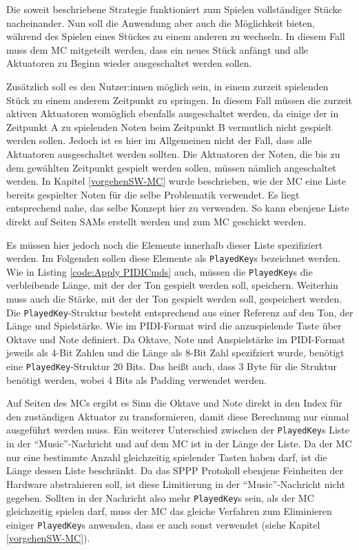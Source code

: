 Die soweit beschriebene Strategie funktioniert zum Spielen vollständiger Stücke nacheinander.
Nun soll die Anwendung aber auch die Möglichkeit bieten, während des Spielen eines Stückes zu einem anderen zu wechseln.
In diesem Fall muss dem \ac{MC} mitgeteilt werden, dass ein neues Stück anfängt und alle Aktuatoren zu Beginn wieder ausgeschaltet werden sollen.

Zusätzlich soll es den Nutzer:innen möglich sein, in einem zurzeit spielenden Stück zu einem anderem Zeitpunkt zu springen.
In diesem Fall müssen die zurzeit aktiven Aktuatoren womöglich ebenfalls ausgeschaltet werden, da einige der in Zeitpunkt A zu spielenden Noten beim Zeitpunkt B vermutlich nicht gespielt werden sollen. \newline
Jedoch ist es hier im Allgemeinen nicht der Fall, dass alle Aktuatoren ausgeschaltet werden sollten.
Die Aktuatoren der Noten, die bis zu dem gewählten Zeitpunkt gespielt werden sollen, müssen nämlich angeschaltet werden. \newline
In Kapitel \ref{vorgehenSW-MC} wurde beschrieben, wie der \ac{MC} eine Liste bereits gespielter Noten für die selbe Problematik verwendet.
Es liegt entsprechend nahe, das selbe Konzept hier zu verwenden.
So kann ebenjene Liste direkt auf Seiten \ac{SAM}s erstellt werden und zum \ac{MC} geschickt werden.

Es müssen hier jedoch noch die Elemente innerhalb dieser Liste spezifiziert werden.
Im Folgenden sollen diese Elemente als \lstinline|PlayedKey|s bezeichnet werden.
Wie in Listing \ref{code:Apply PIDICmds} auch, müssen die \lstinline|PlayedKey|s die verbleibende Länge, mit der der Ton gespielt werden soll, speichern.
Weiterhin muss auch die Stärke, mit der der Ton gespielt werden soll, gespeichert werden.
Die \lstinline|PlayedKey|-Struktur besteht entsprechend aus einer Referenz auf den Ton, der Länge und Spielstärke.
Wie im \ac{PIDI}-Format wird die anzuspielende Taste über Oktave und Note definiert.
Da Oktave, Note und Anspielstärke im \ac{PIDI}-Format jeweils als 4-Bit Zahlen und die Länge als 8-Bit Zahl spezifziert wurde, benötigt eine \lstinline|PlayedKey|-Struktur 20 Bits.
Das heißt auch, dass 3 Byte für die Struktur benötigt werden, wobei 4 Bits als Padding verwendet werden.

Auf Seiten des \ac{MC}s ergibt es Sinn die Oktave und Note direkt in den Index für den zuständigen Aktuator zu transformieren, damit diese Berechnung nur einmal ausgeführt werden muss.
Ein weiterer Unterschied zwischen der \lstinline|PlayedKey|s Liste in der \enquote{Music}-Nachricht und auf dem \ac{MC} ist in der Länge der Liste.
Da der \ac{MC} nur eine bestimmte Anzahl gleichzeitig spielender Tasten haben darf, ist die Länge dessen Liste beschränkt.
Da das \ac{SPPP} Protokoll ebenjene Feinheiten der Hardware abstrahieren soll, ist diese Limitierung in der \enquote{Music}-Nachricht nicht gegeben.
Sollten in der Nachricht also mehr \lstinline|PlayedKey|s sein, als der \ac{MC} gleichzeitig spielen darf, muss der \ac{MC} das gleiche Verfahren zum Eliminieren einiger \lstinline|PlayedKey|s anwenden, dass er auch sonst verwendet (siehe Kapitel \ref{vorgehenSW-MC}).

